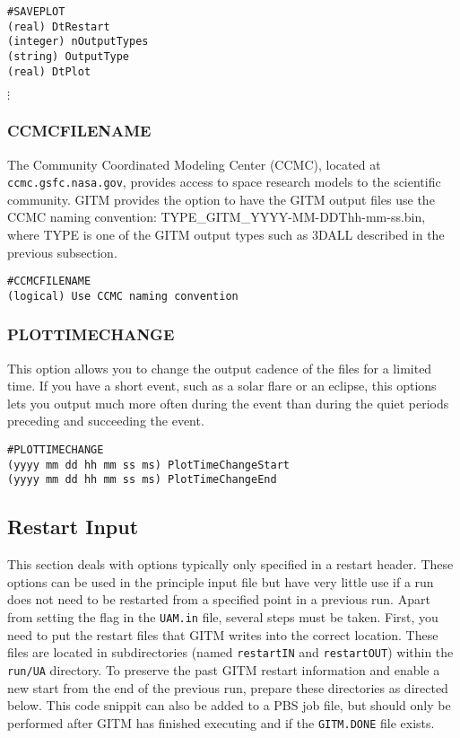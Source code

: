 \begin{verbatim}
#SAVEPLOT
(real) DtRestart
(integer) nOutputTypes 
(string) OutputType
(real) DtPlot   
\end{verbatim}
\vspace{-.1in}
\hspace{.6in} $\vdots$
\vspace{.1in}

\subsubsection{CCMCFILENAME}
\label{ccmcfilename.sec}

The Community Coordinated Modeling Center (CCMC), located at {\tt ccmc.gsfc.nasa.gov}, provides access to space research models to the scientific community.  GITM provides the option to have the GITM output files use the CCMC naming convention: TYPE\_GITM\_YYYY-MM-DDThh-mm-ss.bin, where TYPE is one of the GITM output types such as 3DALL described in the previous subsection.

\begin{verbatim}
#CCMCFILENAME
(logical) Use CCMC naming convention
\end{verbatim}

\subsubsection{PLOTTIMECHANGE}
\label{plottimechange.sec}

This option allows you to change the output cadence of the files for a limited time.  If you have a short event, such as a solar flare or an eclipse, this options lets you output much more often during the event than during the quiet periods preceding and succeeding the event.

\begin{verbatim}
#PLOTTIMECHANGE
(yyyy mm dd hh mm ss ms) PlotTimeChangeStart
(yyyy mm dd hh mm ss ms) PlotTimeChangeEnd
\end{verbatim}



\subsection{Restart Input}

This section deals with options typically only specified in a restart header.  These options can be used in the principle input file but have very little use if a run does not need to be restarted from a specified point in a previous run.  Apart from setting the flag in the {\tt UAM.in} file, several steps must be taken.  First, you need to put the restart files that GITM writes into the correct location.  These files are located in subdirectories (named {\tt restartIN} and {\tt restartOUT}) within the {\tt run/UA} directory.  To preserve the past GITM restart information and enable a new start from the end of the previous run, prepare these directories as directed below.  This code snippit can also be added to a PBS job file, but should only be performed after GITM has finished executing and if the {\tt GITM.DONE} file exists.

